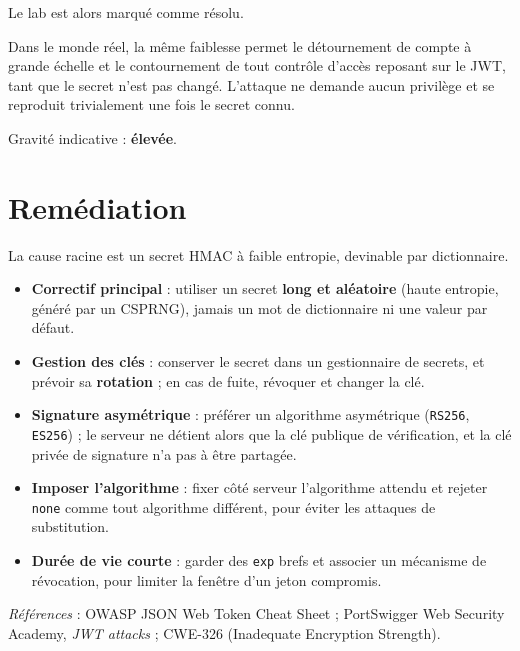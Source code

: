 \documentclass[11pt,a4paper]{article}
\begin{document}

Le lab est alors marqué comme résolu.


Dans le monde réel, la même faiblesse permet le détournement de compte à grande
échelle et le contournement de tout contrôle d'accès reposant sur le JWT, tant
que le secret n'est pas changé. L'attaque ne demande aucun privilège et se
reproduit trivialement une fois le secret connu.

Gravité indicative : \textbf{élevée}.

\section{Remédiation}
La cause racine est un secret HMAC à faible entropie, devinable par dictionnaire.

\begin{itemize}
  \item \textbf{Correctif principal} : utiliser un secret \textbf{long et aléatoire} (haute entropie, généré par un CSPRNG), jamais un mot de dictionnaire ni une valeur par défaut.
  \item \textbf{Gestion des clés} : conserver le secret dans un gestionnaire de secrets, et prévoir sa \textbf{rotation} ; en cas de fuite, révoquer et changer la clé.
  \item \textbf{Signature asymétrique} : préférer un algorithme asymétrique (\texttt{RS256}, \texttt{ES256}) ; le serveur ne détient alors que la clé publique de vérification, et la clé privée de signature n'a pas à être partagée.
  \item \textbf{Imposer l'algorithme} : fixer côté serveur l'algorithme attendu et rejeter \texttt{none} comme tout algorithme différent, pour éviter les attaques de substitution.
  \item \textbf{Durée de vie courte} : garder des \texttt{exp} brefs et associer un mécanisme de révocation, pour limiter la fenêtre d'un jeton compromis.
\end{itemize}

\vspace{4pt}
\noindent\emph{Références} : OWASP JSON Web Token Cheat Sheet ; PortSwigger Web
Security Academy, \emph{JWT attacks} ; CWE-326 (Inadequate Encryption
Strength).
\end{document}
